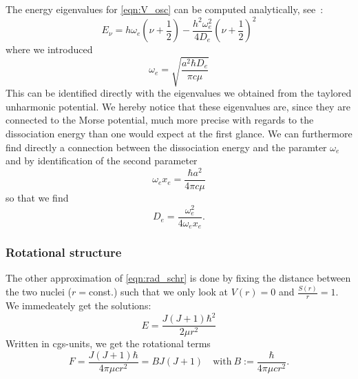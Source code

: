 The energy eigenvalues for \eqref{eqn:V_osc} can be computed analytically, 
see~\cite{fliessbach2008quantenmechanik}:
\begin{equation}
    E_\nu = h \omega_{e} \left( \nu + \frac{1}{2}
        \right) - \frac{h^2 \omega_{e}^2}{4 D_e} 
    \left( \nu + \frac{1}{2} \right)^2
\end{equation}
where we introduced
\begin{equation}
    \omega_{e} = \sqrt{\frac{a^2 \hbar D_e}{\pi c \mu}}
    \label{eqn:w_e}
\end{equation}
This can be identified directly with the eigenvalues we obtained
from the taylored unharmonic potential. We hereby notice that these
eigenvalues are, since they are connected to the Morse potential,
much more precise with regards to the dissociation energy than
one would expect at the first glance. We can furthermore
find directly a connection between the dissociation energy and 
the paramter $\omega_e$ and by identification of the second
parameter
\begin{equation}
    \omega_e x_e = \frac{\hbar a^2}{4\pi c \mu}
    \label{eqn:wx_e}
\end{equation}
so that we find 
\begin{equation}
    D_e = \frac{\omega_e^2}{4 \omega_e x_e}.
    \label{eqn:D_e}
\end{equation}


\subsubsection{Rotational structure}
The other approximation of \eqref{eqn:rad_schr}
is done by fixing the distance between the two 
nuclei ($r =$const.) such that 
we only look at $V(r)=0$ and $\frac{S(r)}{r} = 1$. We immedeately get
the solutions:
\begin{equation}
    E = \frac{J(J+1)\hbar^2}{2\mu r^2}
\end{equation}
Written in cgs-units, we get the rotational terms
\begin{equation}
    F = \frac{J(J+1)\hbar}{4 \pi \mu c r^2} = B J (J + 1) \quad 
    \mathrm{ with \ } B := \frac{\hbar}{4 \pi \mu c r^2}.
\end{equation}

